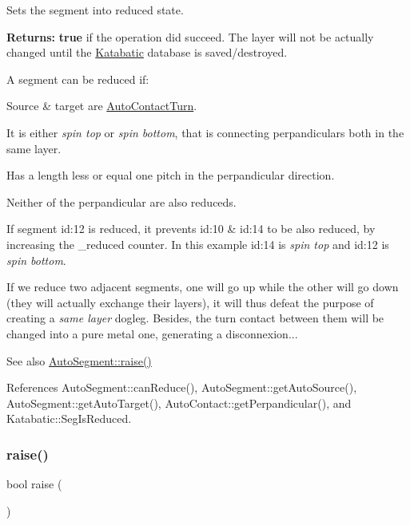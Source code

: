 Sets the segment into reduced state.

{\bfseries Returns\+:} {\bfseries true} if the operation did succeed. The layer will not be actually changed until the \hyperlink{namespaceKatabatic}{Katabatic} database is saved/destroyed.

A segment can be reduced if\+:
\begin{DoxyItemize}
\item Source \& target are \hyperlink{classKatabatic_1_1AutoContactTurn}{Auto\+Contact\+Turn}.
\item It is either {\itshape spin top} or {\itshape spin bottom}, that is connecting perpandiculars both in the same layer.
\item Has a length less or equal one pitch in the perpandicular direction.
\item Neither of the perpandicular are also reduceds.
\end{DoxyItemize}

 If segment {\ttfamily id\+:12} is reduced, it prevents {\ttfamily id\+:10} \& {\ttfamily id\+:14} to be also reduced, by increasing the {\ttfamily \+\_\+reduced} counter. In this example {\ttfamily id\+:14} is {\itshape spin top} and {\ttfamily id\+:12} is {\itshape spin bottom}.

If we reduce two adjacent segments, one will go up while the other will go down (they will actually exchange their layers), it will thus defeat the purpose of creating a {\itshape same layer} dogleg. Besides, the turn contact between them will be changed into a pure metal one, generating a disconnexion...

\begin{DoxySeeAlso}{See also}
\hyperlink{classKatabatic_1_1AutoSegment_ace393c3c082a5e62a348168354660e39}{Auto\+Segment\+::raise()} 
\end{DoxySeeAlso}


References Auto\+Segment\+::can\+Reduce(), Auto\+Segment\+::get\+Auto\+Source(), Auto\+Segment\+::get\+Auto\+Target(), Auto\+Contact\+::get\+Perpandicular(), and Katabatic\+::\+Seg\+Is\+Reduced.

\mbox{\label{classKatabatic_1_1AutoSegment_ace393c3c082a5e62a348168354660e39}} 
\subsubsection{\texorpdfstring{raise()}{raise()}}
{\footnotesize\ttfamily bool raise (\begin{DoxyParamCaption}{ }\end{DoxyParamCaption})}

